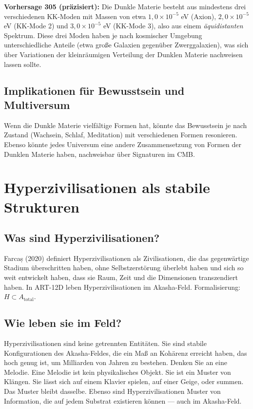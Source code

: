 \textbf{Vorhersage 305 (präzisiert):} Die Dunkle Materie besteht aus mindestens drei verschiedenen KK-Moden mit Massen von etwa $1,0\times10^{-5}$ eV (Axion), $2,0\times10^{-5}$ eV (KK-Mode 2) und $3,0\times10^{-5}$ eV (KK-Mode 3), also aus einem \emph{äquidistanten} Spektrum. Diese drei Moden haben je nach kosmischer Umgebung unterschiedliche Anteile (etwa große Galaxien gegenüber Zwerggalaxien), was sich über Variationen der kleinräumigen Verteilung der Dunklen Materie nachweisen lassen sollte.

\subsection{Implikationen für Bewusstsein und Multiversum}
Wenn die Dunkle Materie vielfältige Formen hat, könnte das Bewusstsein je nach Zustand (Wachsein, Schlaf, Meditation) mit verschiedenen Formen resonieren. Ebenso könnte jedes Universum eine andere Zusammensetzung von Formen der Dunklen Materie haben, nachweisbar über Signaturen im CMB.

\section{Hyperzivilisationen als stabile Strukturen}
\subsection{Was sind Hyperzivilisationen?}
Farcaș (2020) definiert Hyperzivilisationen als Zivilisationen, die das gegenwärtige Stadium überschritten haben, ohne Selbstzerstörung überlebt haben und sich so weit entwickelt haben, dass sie Raum, Zeit und die Dimensionen transzendiert haben. In ART-12D leben Hyperzivilisationen im Akasha-Feld. Formalisierung: $H \subset A_{\text{total}}$.

\subsection{Wie leben sie im Feld?}
Hyperzivilisationen sind keine getrennten Entitäten. Sie sind stabile Konfigurationen des Akasha-Feldes, die ein Maß an Kohärenz erreicht haben, das hoch genug ist, um Milliarden von Jahren zu bestehen. Denken Sie an eine Melodie. Eine Melodie ist kein physikalisches Objekt. Sie ist ein Muster von Klängen. Sie lässt sich auf einem Klavier spielen, auf einer Geige, oder summen. Das Muster bleibt dasselbe. Ebenso sind Hyperzivilisationen Muster von Information, die auf jedem Substrat existieren können --- auch im Akasha-Feld.

